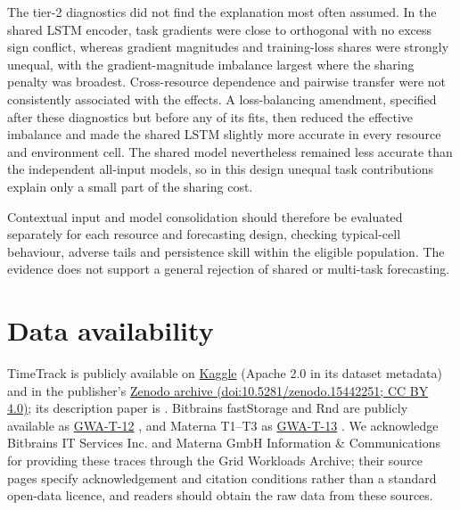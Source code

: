 \documentclass[5p,twocolumn]{elsarticle}
\begin{document}
The tier-2 diagnostics did not find the explanation most often assumed. In
the shared LSTM encoder, task gradients were close to orthogonal with no
excess sign conflict, whereas gradient magnitudes and training-loss shares
were strongly unequal, with the gradient-magnitude imbalance largest where
the sharing penalty was broadest. Cross-resource dependence and pairwise
transfer were not consistently associated with the effects. A
loss-balancing amendment, specified after these diagnostics but before any of
its fits, then reduced the effective imbalance and made the
shared LSTM slightly more accurate in every resource and environment cell.
The shared model nevertheless remained less accurate than the independent
all-input models, so in this design unequal task contributions explain only
a small part of the sharing cost.

Contextual input and model consolidation should therefore be evaluated
separately for each resource and forecasting design, checking typical-cell
behaviour, adverse tails and persistence skill within the eligible
population. The evidence does not support a general rejection of shared or
multi-task forecasting.

\section*{Data availability}

TimeTrack is publicly available on
\href{https://www.kaggle.com/datasets/abdelghanimeliani/open-air-interface-cicd-timeseries-dataset}{Kaggle}
(Apache 2.0 in its dataset metadata) and in the publisher's
\href{https://doi.org/10.5281/zenodo.15442251}{Zenodo archive
(doi:10.5281/zenodo.15442251; CC BY 4.0)}; its description paper is
\citet{Meliani2025TimeTrack}. Bitbrains fastStorage and Rnd are publicly
available as \href{https://atlarge-research.com/gwa-t-12/}{GWA-T-12}
\citep{Shen2015Bitbrains}, and Materna T1--T3 as
\href{https://atlarge-research.com/gwa-t-13/}{GWA-T-13}
\citep{Kohne2014FederatedCloudSim,Kohne2016SLAScheduling}. We acknowledge
Bitbrains IT Services Inc. and Materna GmbH Information \& Communications for
providing these traces through the Grid Workloads Archive; their source pages
specify acknowledgement and citation conditions rather than a standard
open-data licence, and readers should obtain the raw data from these sources.
\end{document}

